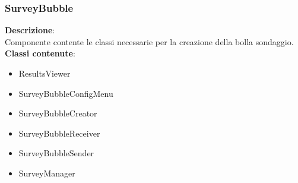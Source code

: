 \subsubsection{SurveyBubble}
   \FloatBarrier
\FloatBarrier
\textbf{Descrizione}:\\
 Componente contente le classi necessarie per la creazione della bolla sondaggio. 
\\ \textbf{Classi contenute}:\\
\begin{itemize}
\item ResultsViewer
\item SurveyBubbleConfigMenu
\item SurveyBubbleCreator
\item SurveyBubbleReceiver
\item SurveyBubbleSender
\item SurveyManager
\end{itemize}


\clearpage

